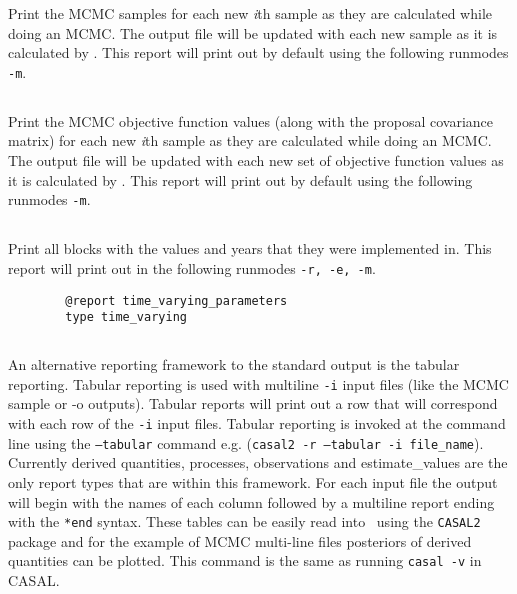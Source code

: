 Print the MCMC samples for each new \textit{i}th sample as they are calculated while doing an MCMC. The output file will be updated with each new sample as it is calculated by \CNAME. This report will print out by default using the following runmodes \texttt{-m}.

\subsection{}

Print the MCMC objective function values (along with the proposal covariance matrix) for each new \textit{i}th sample as they are calculated while doing an MCMC. The output file will be updated with each new set of objective function values as it is calculated by \CNAME. This report will print out by default using the following runmodes \texttt{-m}.

\subsection{}

Print all  blocks with the values and years that they were implemented in. This report will print out in the following runmodes \texttt{-r, -e, -m}.

{\small{\begin{verbatim}
		@report time_varying_parameters
		type time_varying
		\end{verbatim}}}

\subsection{}\label{sub:tabular}
An alternative reporting framework to the standard output is the tabular reporting. Tabular reporting is used with multiline \texttt{-i} input files (like the MCMC sample or -o outputs). Tabular reports will print out a row that will correspond with each row of the \texttt{-i} input files. Tabular reporting is invoked at the command line using the \texttt{--tabular} command e.g. (\texttt{casal2 -r --tabular -i file\_name}). Currently derived quantities, processes, observations and estimate\_values are the only report types that are within this framework. For each input file the output will begin with the names of each column followed by a multiline report ending with the \texttt{*end} syntax. These tables can be easily read into \R\ using the \texttt{CASAL2} package and for the example of MCMC multi-line files posteriors of derived quantities can be plotted. This command is the same as running \texttt{casal -v} in CASAL.


